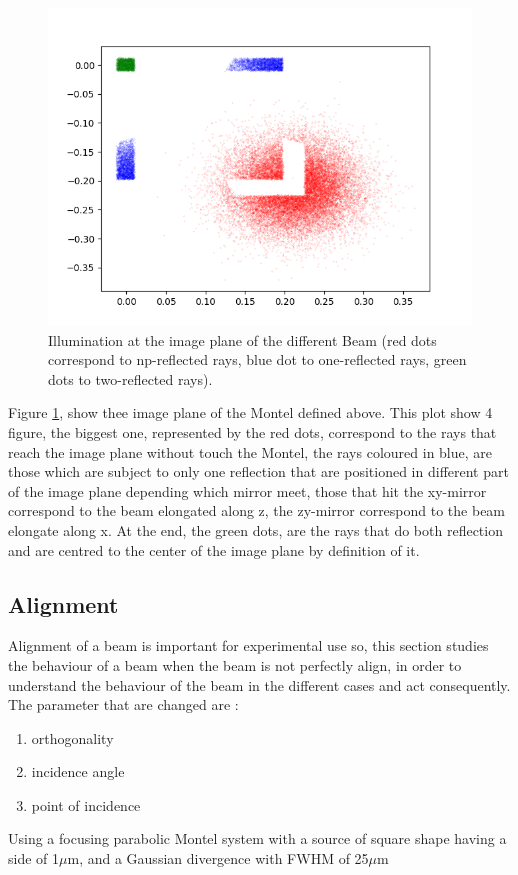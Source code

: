 \begin{figure}[]
%
\centering
%
\includegraphics[width=.6\textwidth]{Immagini/Chapter4/BigSourceMontel}
%
\caption{Illumination at the image plane of the different Beam (red dots correspond to np-reflected rays, blue dot to one-reflected rays, green dots to two-reflected rays).}
%
\label{fig:BigSourceMontel}
%
\end{figure}
%
Figure \ref{fig:BigSourceMontel}, show thee image plane of the Montel defined above. This plot show 4 figure, the biggest one, represented by the red dots, correspond to the rays that reach the image plane without touch the Montel, the rays coloured in blue, are those which are subject to only one reflection that are positioned in different part of the image plane depending which mirror meet, those that hit the xy-mirror correspond to the beam elongated along z, the zy-mirror correspond to the beam elongate along x. At the end, the green dots, are the rays that do both reflection and are centred to the center of the image plane by definition of it. 
\subsection{Alignment}
Alignment of a beam is important for experimental use so, this section studies the behaviour of a beam when the beam is not perfectly align, in order to understand the behaviour of the beam in the different cases and act consequently. 
\\
The parameter that are changed are :
\begin{enumerate}
	\item orthogonality
	\item incidence angle
	\item point of incidence
\end{enumerate}
Using a focusing parabolic Montel system with a source of square shape having a side of 1$\mu $m, and a Gaussian divergence with FWHM of 25$\mu $m

